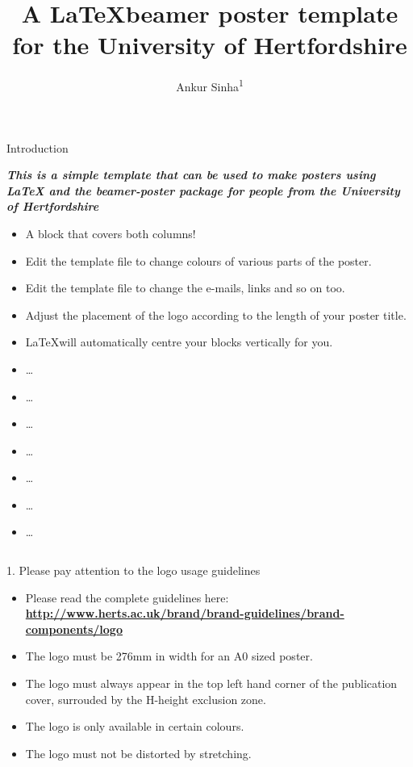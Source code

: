 \documentclass[final]{beamer}
\title[UH poster]{\Huge A \LaTeX beamer poster template for the University of Hertfordshire}
\author[Sinha]{Ankur Sinha\textsuperscript{1}}
\institute[UH]{\textsuperscript{1}University of Hertfordshire, UK}
\begin{document}
\begin{frame}{} 
  \begin{block}{Introduction}
    \begin{center}
      \emph{\textbf{This is a simple template that can be used to make posters using LaTeX and the beamer-poster package for people from the University of Hertfordshire}}
      \begin{itemize}
        \item A block that covers both columns!
        \item Edit the template file to change colours of various parts of the poster.
        \item Edit the template file to change the e-mails, links and so on too.
        \item Adjust the placement of the logo according to the length of your poster title.
        \item \LaTeX will automatically centre your blocks vertically for you.
        \item \ldots
        \item \ldots
        \item \ldots
        \item \ldots
        \item \ldots
        \item \ldots
        \item \ldots
      \end{itemize}
    \end{center}
  \end{block}
  \begin{columns}
    \begin{column}{0.49\textwidth}
      \begin{block}{1. Please pay attention to the logo usage guidelines}
        \begin{itemize}
          \item Please read the complete guidelines here: \textbf{\href{http://www.herts.ac.uk/brand/brand-guidelines/brand-components/logo}{http://www.herts.ac.uk/brand/brand-guidelines/brand-components/logo}}
          \item The logo must be \alert{276mm} in width for an A0 sized poster.
          \item The logo must always appear in the \alert{top left hand corner} of the publication cover, surrouded by the H-height exclusion zone.
          \item The logo is only available in certain colours.
          \item The logo must not be distorted by stretching.

\end{itemize}
\end{block}
\end{column}
\end{columns}
\end{frame}
\end{document}
